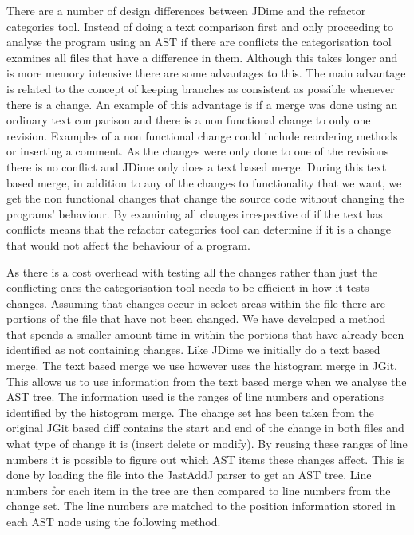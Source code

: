 There are a number of design differences between JDime and the refactor categories tool.  Instead of doing a text comparison first and only proceeding to analyse the program using an AST if there are conflicts the categorisation tool examines all files that have a difference in them.  Although this takes longer and is more memory intensive there are some advantages to this. The main advantage is related to the concept of keeping branches as consistent as possible whenever there is a change. An example of this advantage is if a merge was done using an ordinary text comparison and there is a non functional change to only one revision. Examples of a non functional change could include reordering methods or inserting a comment.  As the changes were only done to one of the revisions there is no conflict and JDime only does a text based merge.  During this text based merge, in addition to any of the changes to functionality that we want, we get the non functional changes that change the source code without changing the programs' behaviour. By examining all changes irrespective of if the text has conflicts means that the refactor categories tool can determine if it is a change that would not affect the behaviour of a program.

As there is a cost overhead with testing all the changes rather than just the conflicting ones the categorisation tool needs to be efficient in how it tests changes.  Assuming that changes occur in select areas within the file there are portions of the file that have not been changed.  We have developed a method that spends a smaller amount time in  within the portions that have already been identified as not containing changes.  Like JDime we initially do a text based merge.  The text based merge we use however uses the histogram merge in JGit.  This allows us to use information from the text based merge when we analyse the AST tree.  The information used is the ranges of line numbers and operations identified by the histogram merge. The change set has been taken from the original JGit based diff contains the start and end of the change in both files and what type of change it is (insert delete or modify).  By reusing these ranges of line numbers it is possible to figure out which AST items these changes affect. This is done by loading the file into the JastAddJ parser to get an AST tree. Line numbers for each item in the tree are then compared to line numbers from the change set. The line numbers are matched to the position information stored in each AST node using the following method.


